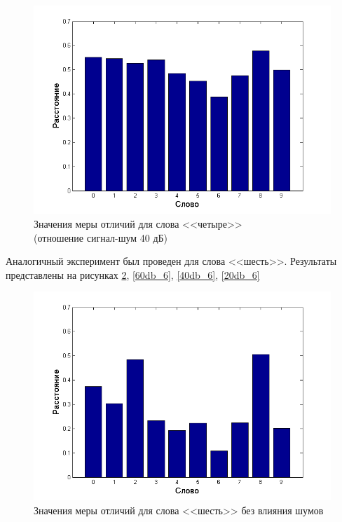 \documentclass[a4paper,14pt,russian,utf8,nocolumnsxix,nocolumnxxxi,nocolumnxxxii]{eskdtext}
\begin{document}
\begin{figure}[H]	
	\centering
	\includegraphics[width=120mm]{40db_4.png}			
	\caption{Значения меры отличий для слова <<четыре>> \\ (отношение сигнал-шум 40 дБ)}
	\label{40db_4}
\end{figure}

Аналогичный эксперимент был проведен для слова <<шесть>>. Результаты представлены на рисунках \ref{clear_6}, \ref{60db_6}, \ref{40db_6}, \ref{20db_6}

\begin{figure}[H]	
	\centering
	\includegraphics[width=120mm]{clear_6.png}			
	\caption{Значения меры отличий для слова <<шесть>> без влияния шумов}
	\label{clear_6}
\end{figure}
\end{document}
